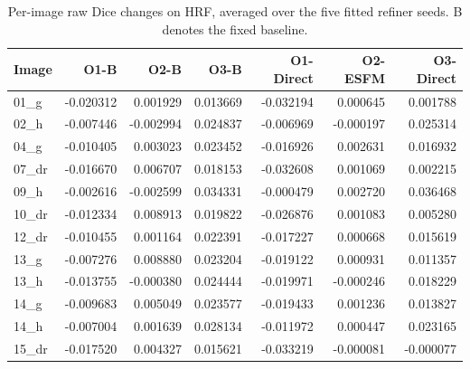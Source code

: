 \begin{table}[p]
\caption{Per-image raw Dice changes on HRF, averaged over the five fitted refiner seeds. B denotes the fixed baseline.}\label{tab:completion-hrf-image-differences}
\centering\small\setlength{\tabcolsep}{4pt}
\begin{tabular}{lrrrrrr}
\toprule
Image & O1-B & O2-B & O3-B & O1-Direct & O2-ESFM & O3-Direct \\
\midrule
01\_g & -0.020312 & 0.001929 & 0.013669 & -0.032194 & 0.000645 & 0.001788 \\
02\_h & -0.007446 & -0.002994 & 0.024837 & -0.006969 & -0.000197 & 0.025314 \\
04\_g & -0.010405 & 0.003023 & 0.023452 & -0.016926 & 0.002631 & 0.016932 \\
07\_dr & -0.016670 & 0.006707 & 0.018153 & -0.032608 & 0.001069 & 0.002215 \\
09\_h & -0.002616 & -0.002599 & 0.034331 & -0.000479 & 0.002720 & 0.036468 \\
10\_dr & -0.012334 & 0.008913 & 0.019822 & -0.026876 & 0.001083 & 0.005280 \\
12\_dr & -0.010455 & 0.001164 & 0.022391 & -0.017227 & 0.000668 & 0.015619 \\
13\_g & -0.007276 & 0.008880 & 0.023204 & -0.019122 & 0.000931 & 0.011357 \\
13\_h & -0.013755 & -0.000380 & 0.024444 & -0.019971 & -0.000246 & 0.018229 \\
14\_g & -0.009683 & 0.005049 & 0.023577 & -0.019433 & 0.001236 & 0.013827 \\
14\_h & -0.007004 & 0.001639 & 0.028134 & -0.011972 & 0.000447 & 0.023165 \\
15\_dr & -0.017520 & 0.004327 & 0.015621 & -0.033219 & -0.000081 & -0.000077 \\
\bottomrule
\end{tabular}
\end{table}
